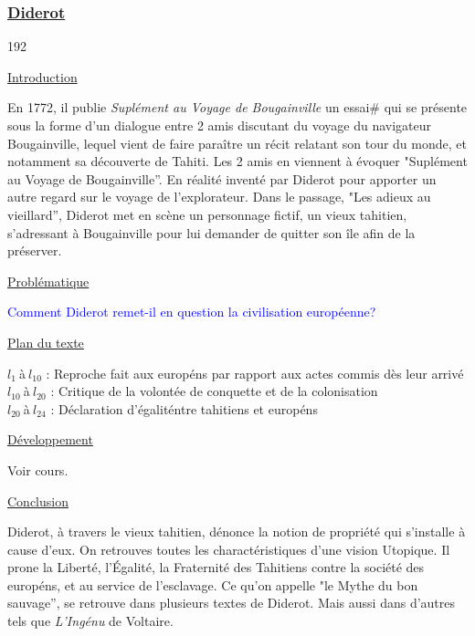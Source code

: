 \documentclass[12pt,a4paper]{article}
\begin{document}
			\subsubsection{\href{Bio/Diderot.pdf}{Diderot}}
\begin{dingautolist}{192}

\item \underline{Introduction} \par
	En 1772, il publie \textit{Supl\'ement au Voyage de Bougainville} un essai\# qui se pr\'esente sous la forme d'un dialogue entre 2 amis discutant du voyage du navigateur Bougainville, 
	lequel vient de faire para\^itre un r\'ecit relatant son tour du monde, et notamment sa d\'ecouverte de Tahiti.
	Les 2 amis en viennent \`a \'evoquer "Supl\'ement au Voyage de Bougainville''. En r\'ealit\'e invent\'e par Diderot pour apporter un autre regard sur le voyage de l'explorateur.
	Dans le passage, "Les adieux au vieillard'', Diderot met en sc\`ene un personnage fictif, un vieux tahitien, s'adressant \`a Bougainville pour lui demander de quitter son \^ile afin de la pr\'eserver.

\item \underline{Probl\'ematique }\par
	\textcolor{blue}{Comment Diderot remet-il en question la civilisation europ\'eenne?}

\item \underline{Plan du texte} \par
	$l_{1}~$\`a$~l_{10}$ : Reproche fait aux europ\'ens par rapport aux actes commis d\`es leur arriv\'e\\
	$l_{10}~$\`a$~l_{20}$ : Critique de la volont\'ee de conquette et de la colonisation\\
	$l_{20}~$\`a$~l_{24}$ : D\'eclaration d'\'egalit\' entre tahitiens et europ\'ens 

\item \underline{D\'eveloppement} \par
        Voir cours.

\item \underline{Conclusion} \par
	Diderot, \`a travers le vieux tahitien, d\'enonce la notion de propri\'et\'e qui s'installe \`a cause d'eux.
	On retrouves toutes les charact\'eristiques d'une vision Utopique.
	Il prone la Libert\'e, l'\'Egalit\'e, la Fraternit\'e des Tahitiens contre la soci\'et\'e des europ\'ens, et au service de l'esclavage.
	Ce qu'on appelle "le Mythe du bon sauvage'', se retrouve dans plusieurs textes de Diderot. Mais aussi dans d'autres tels que \textit{L'Ing\'enu} de Voltaire.

\end{dingautolist}
 \newpage
\end{document}
